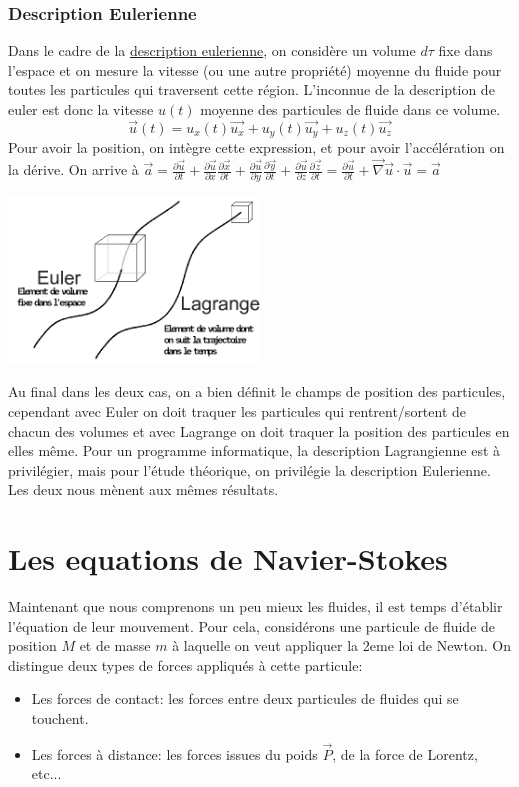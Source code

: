 \documentclass[a4paper,10pt]{report}
\begin{document}
\subsubsection{Description Eulerienne}
Dans le cadre de la \href{https://fr.wikipedia.org/wiki/Description_eulérienne}{description eulerienne}, on considère un volume $d\tau$ fixe dans l'espace et on mesure la vitesse (ou une autre propriété) moyenne du fluide pour toutes les particules qui traversent cette région. L'inconnue de la description de euler est donc la vitesse $u(t)$ moyenne des particules de fluide dans ce volume.
$$\vec{u}(t) = u_x(t)\vec{u_x} + u_y(t)\vec{u_y} + u_z(t)\vec{u_z}$$
Pour avoir la position, on intègre cette expression, et pour avoir l'accélération on la dérive.
On arrive à $\vec{a} = \frac{\partial \vec{u}}{\partial t} + \frac{\partial \vec{u}}{\partial x}\frac{\partial \vec{x}}{\partial t} + \frac{\partial \vec{u}}{\partial y}\frac{\partial \vec{y}}{\partial t} +\frac{\partial \vec{u}}{\partial z}\frac{\partial \vec{z}}{\partial t} = \boxed{ \frac{\partial \vec{u}}{\partial t} + \vec{\nabla}\vec{u}\cdot \vec{u} = \vec{a}}$
\begin{center}
 \includegraphics[width=0.5\textwidth]{eulerian_vs_lagrangian_description}
\end{center}

Au final dans les deux cas, on a bien définit le champs de position des particules, cependant avec Euler on doit traquer les particules qui rentrent/sortent de chacun des volumes et avec Lagrange on doit traquer la position des particules en elles même. Pour un programme informatique, la description Lagrangienne est à privilégier, mais pour l'étude théorique, on privilégie la description Eulerienne. Les deux nous mènent aux mêmes résultats.

\section{Les equations de Navier-Stokes}
Maintenant que nous comprenons un peu mieux les fluides, il est temps d'établir l'équation de leur mouvement. Pour cela, considérons une particule de fluide de position $M$ et de masse $m$ à laquelle on veut appliquer la 2eme loi de Newton. On distingue deux types de forces appliqués à cette particule:
\begin{itemize}
 \item Les forces de contact: les forces entre deux particules de fluides qui se touchent.
 \item Les forces à distance: les forces issues du poids $\vec{P}$, de la force de Lorentz, etc...
\end{itemize}
\end{document}
